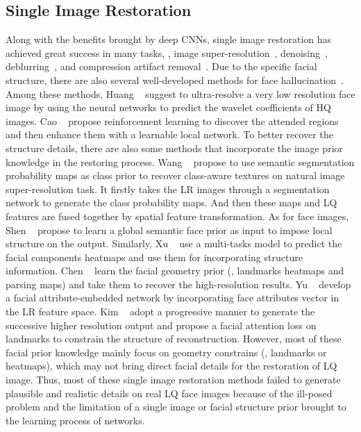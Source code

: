 \documentclass[runningheads]{llncs}
\begin{document}
\subsection{Single Image Restoration}
Along with the benefits brought by deep CNNs, single image restoration has achieved great success in many tasks, \eg, image super-resolution~\cite{dong2014learning,kim2016accurate,ledig2017photo,zhang2018rcan,Zhang_2019_CVPR}, denoising~\cite{zhang2017beyond,zhang2018ffdnet,yang2017bm3d,guo2019toward}, deblurring~\cite{nah2017deep,kupyn2018deblurgan,zhang2019deep}, and compression artifact removal~\cite{dong2015compression,galteri2017deep,guo2017one}. Due to the specific facial structure, there are also several well-developed methods for face hallucination~\cite{zhu2016deep,cao2017attention,huang2017wavelet,xu2017learning,chrysos2017deep,Yu_2018_ECCV,Yu_2018_CVPR,progressive_face_sr,Chen_2018_CVPR}. Among these methods, Huang \etal~\cite{huang2017wavelet} suggest to  ultra-resolve a very low resolution face image by using the neural networks to predict the wavelet coefficients of HQ images. Cao \etal~\cite{cao2017attention} propose reinforcement learning to discover the attended regions and then enhance them with a learnable local network. To better recover the structure details, there are also some methods that incorporate the image prior knowledge in the restoring process. Wang \etal~\cite{wang2018recovering} propose to use semantic segmentation probability maps as class prior to recover class-aware textures on natural image super-resolution task. It firstly takes the LR images through a segmentation network to generate the class probability maps. And then these maps and LQ features are fused together by spatial feature transformation. As for face images, Shen \etal~\cite{shen2018deep} propose to learn a global semantic face prior as input to impose local structure on the output. Similarly, Xu \etal~\cite{Yu_2018_ECCV} use a multi-tasks model to predict the facial components heatmaps and use them for incorporating structure information. Chen \etal~\cite{Chen_2018_CVPR} learn the facial geometry prior (\ie, landmarks heatmaps and parsing maps) and take them to recover the high-resolution results. Yu \etal~\cite{Yu_2018_CVPR} develop a facial attribute-embedded network by incorporating face attributes vector in the LR feature space. Kim \etal~\cite{progressive_face_sr} adopt a progressive manner to generate the successive higher resolution output and propose a facial attention loss on landmarks to constrain the structure of reconstruction. However, most of these facial prior knowledge mainly focus on geometry constrains (\ie, landmarks or heatmaps), which may not bring direct facial details for the restoration of LQ image. Thus, most of these single image restoration methods failed to generate plausible and realistic details on real LQ face images because of the ill-posed problem and the limitation of a single image or facial structure prior brought to the learning process of networks.
\end{document}
